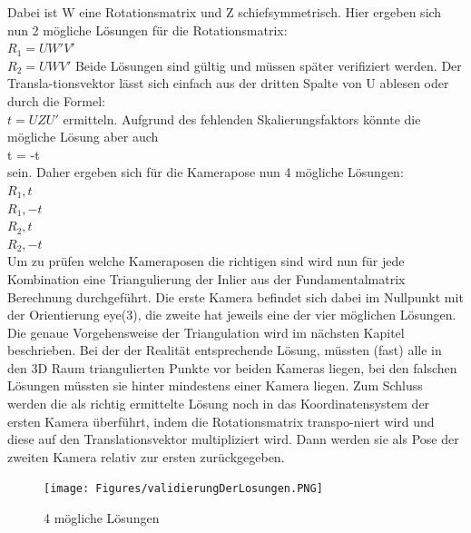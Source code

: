 Dabei ist W eine Rotationsmatrix und Z schiefsymmetrisch. Hier ergeben sich nun 2 mögliche Lösungen für die Rotationsmatrix:
\\
$R_1 = UW'V'$
\\
$R_2 = UWV'$
Beide Lösungen sind gültig und müssen später verifiziert werden. Der Transla-tionsvektor lässt sich einfach aus der dritten Spalte von U ablesen oder durch die Formel:
\\
$t = UZU'$
ermitteln. Aufgrund des fehlenden Skalierungsfaktors könnte die mögliche Lösung aber auch
\\
t = -t
\\
sein. Daher ergeben sich für die Kamerapose nun 4 mögliche Lösungen:
\\
$R_1, t$
\\
$R_1, -t$
\\
$R_2, t$
\\
$R_2, -t$
\\
Um zu prüfen welche Kameraposen die richtigen sind wird nun für jede Kombination eine Triangulierung der Inlier aus der Fundamentalmatrix Berechnung durchgeführt. Die erste Kamera befindet sich dabei im Nullpunkt mit der Orientierung eye(3), die zweite hat jeweils eine der vier möglichen Lösungen. Die genaue Vorgehensweise der Triangulation wird im nächsten Kapitel beschrieben. Bei der der Realität entsprechende Lösung, müssten (fast) alle in den 3D Raum triangulierten Punkte vor beiden Kameras liegen, bei den falschen Lösungen müssten sie hinter mindestens einer Kamera liegen. Zum Schluss werden die als richtig ermittelte Lösung noch in das Koordinatensystem der ersten Kamera überführt, indem die Rotationsmatrix transpo-niert wird und diese auf den Translationsvektor multipliziert wird. Dann werden sie als Pose der zweiten Kamera relativ zur ersten zurückgegeben.
\begin{figure}[ht]
    \centering
    \texttt{[image: Figures/validierungDerLosungen.PNG]}
    \caption{4 mögliche Lösungen}
\end{figure}

